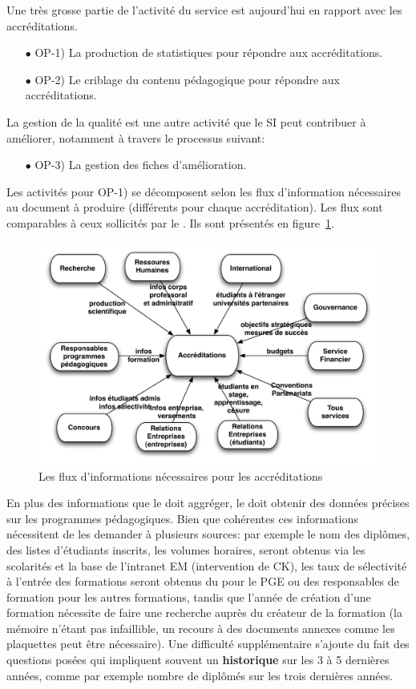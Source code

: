 \documentclass{book}
\begin{document}
Une très grosse partie de l'activité du service est aujourd'hui en rapport 
avec les accréditations. 
\begin{itemize}
\item[$\bullet$] OP-1) La production de statistiques pour répondre aux 
			     accréditations.
\item[$\bullet$] OP-2) Le criblage du contenu pédagogique pour répondre 
			     aux accréditations.
\end{itemize}
La gestion de la qualité est une autre activité que le SI peut contribuer à
améliorer, notamment à travers le processus suivant:
\begin{itemize}
\item[$\bullet$] OP-3) La gestion des fiches d'amélioration.
\end{itemize}
\bigskip
Les activités pour OP-1) se décomposent selon les flux d'information 
nécessaires au document à produire (différents pour chaque accréditation). 
Les flux sont comparables à ceux sollicités par le \scom. Ils sont présentés 
en figure~\ref{fg:accred_flux}.
\begin{figure}[hbt]
\begin{center}
\includegraphics[width=.75\linewidth]{figs/accred_flux.pdf}
\end{center}
\caption{Les flux d'informations nécessaires pour les accréditations}
\label{fg:accred_flux}
\end{figure}
En plus des informations que le \scom doit aggréger, le \sop doit obtenir des 
données précises sur les programmes pédagogiques. Bien que cohérentes ces 
informations nécessitent de les demander à plusieurs sources: par exemple
le nom des diplômes, des listes d'étudiants inscrits, les volumes horaires,
seront obtenus via les scolarités et la base de l'intranet EM (intervention de 
CK), les taux de sélectivité à l'entrée des formations seront obtenus du \sconc 
pour le PGE ou des responsables de formation pour les autres formations, 
tandis que l'année de création d'une formation nécessite
de faire une recherche auprès du créateur de la formation (la mémoire n'étant
pas infaillible, un recours à des documents annexes comme les plaquettes peut
être nécessaire).
Une difficulté supplémentaire s'ajoute du fait des questions posées qui 
impliquent souvent un \textbf{historique} sur les 3 à 5 dernières années, comme 
par exemple nombre de diplômés sur les trois dernières années.
\end{document}
